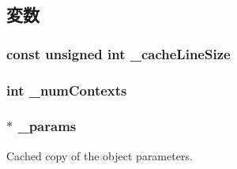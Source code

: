 \subsection{変数}
\hypertarget{classSystem_a6e1b97389f603fc046fbb42ba91136e2}{
\subsubsection[{\_\-cacheLineSize}]{\setlength{\rightskip}{0pt plus 5cm}const unsigned int {\bf \_\-cacheLineSize}}}
\label{classSystem_a6e1b97389f603fc046fbb42ba91136e2}
\hypertarget{classSystem_a13d38579137b1a8b8a2fcfdd501f8d4a}{
\subsubsection[{\_\-numContexts}]{\setlength{\rightskip}{0pt plus 5cm}int {\bf \_\-numContexts}}}
\label{classSystem_a13d38579137b1a8b8a2fcfdd501f8d4a}
\hypertarget{classSystem_afb9ae78c3e2cd51a280162491c99366c}{
\subsubsection[{\_\-params}]{$\ast$ {\bf \_\-params}}}
\label{classSystem_afb9ae78c3e2cd51a280162491c99366c}
Cached copy of the object parameters. 

